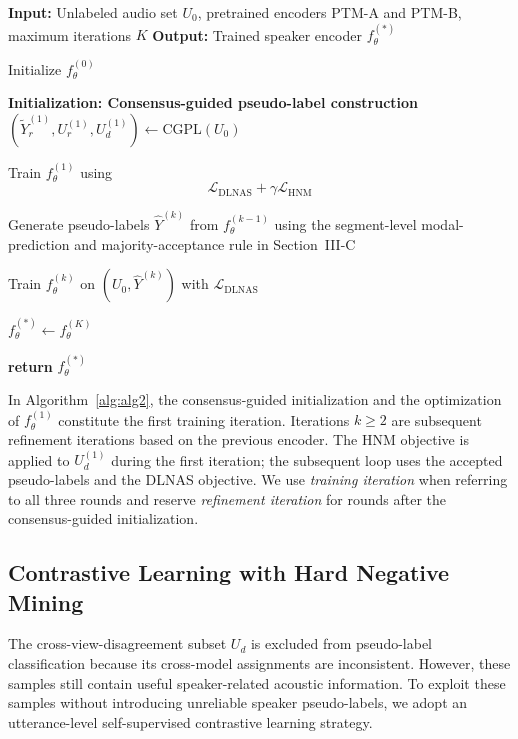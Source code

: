 \documentclass[journal]{IEEEtran}
\begin{document}
\begin{algorithm}[t]
\caption{Iterative Unsupervised Speaker Verification Training with Consensus-Guided Initialization}
\label{alg:alg2}
\begin{algorithmic}

\STATE 
\STATE \textbf{Input:} Unlabeled audio set $U_0$, pretrained encoders PTM-A and PTM-B, maximum iterations $K$
\STATE \textbf{Output:} Trained speaker encoder $f_{\theta}^{(*)}$

\STATE Initialize $f_{\theta}^{(0)}$

\STATE \textbf{Initialization: Consensus-guided pseudo-label construction}
\STATE $(\tilde{Y}_r^{(1)},U_r^{(1)},U_d^{(1)})
\gets \mathrm{CGPL}(U_0)$
\hfill {}

\STATE Train $f_{\theta}^{(1)}$ using
\[
\mathcal{L}_{\mathrm{DLNAS}}
+
\gamma\mathcal{L}_{\mathrm{HNM}}
\]


    \STATE Generate pseudo-labels $\hat{Y}^{(k)}$ from
    $f_{\theta}^{(k-1)}$ using the segment-level modal-prediction and
    majority-acceptance rule in Section~III-C

\STATE Train $f_{\theta}^{(k)}$ on
$(U_0,\hat{Y}^{(k)})$ with $\mathcal{L}_{\mathrm{DLNAS}}$

\ENDFOR

\STATE $f_{\theta}^{(*)}\gets f_{\theta}^{(K)}$

\STATE \textbf{return} $f_{\theta}^{(*)}$

\end{algorithmic}
\end{algorithm}

In Algorithm~\ref{alg:alg2}, the consensus-guided initialization and the
optimization of $f_{\theta}^{(1)}$ constitute the first training iteration.
Iterations $k\geq2$ are subsequent refinement iterations based on the
previous encoder. The HNM objective is applied to $U_d^{(1)}$ during the
first iteration; the subsequent loop uses the accepted pseudo-labels and the
DLNAS objective. We use
\emph{training iteration} when referring to all three rounds and reserve
\emph{refinement iteration} for rounds after the consensus-guided
initialization.


\subsection{Contrastive Learning with Hard Negative Mining}

The cross-view-disagreement subset $U_d$ is excluded from pseudo-label classification
because its cross-model assignments are inconsistent.
However, these samples still contain useful speaker-related acoustic
information.
To exploit these samples without introducing unreliable speaker
pseudo-labels, we adopt an utterance-level self-supervised contrastive
learning strategy.
\end{document}
